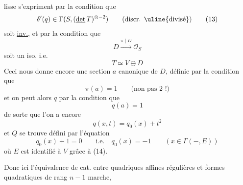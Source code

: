 lisse s'expriment par la condition que
\[
\delta'(q)\in\Gamma(S,(\underline{\det}\,T)^{\otimes-2})\qquad\text{(discr. \uline{divisé})}\tag*{(13)}
\]
soit \uline{inv.}, et par la condition que
\[
D\xrightarrow{\pi\mid D}\mathcal O_S
\]
soit un iso, i.e.
\[
T\simeq V\oplus D\tag*{(14)}
\]
Ceci nous donne encore une section $a$ canonique de $D$, définie par la condition que
\[
\pi(a)=1\qquad\text{(non pas 2 !)}\tag*{(15)}
\]
et on peut alors  $q$ par la condition que
\[
q(a)=1\tag*{(16)}
\]
de sorte que l'on a encore
\[
q(x,t)=q_0(x)+t^2\tag*{(17)}
\]
et $Q$ se trouve défini par l'équation
\[
q_0(x)+1=0\qquad\text{i.e.}\quad q_0(x)=-1\qquad(x\in\Gamma(-,E))\tag*{(18)}
\]
où $E$ est identifié à $V$ grâce à (14).

Donc ici l'équivalence de cat. entre quadriques affines régulières  et formes quadratiques  de rang $n-1$ marche,
